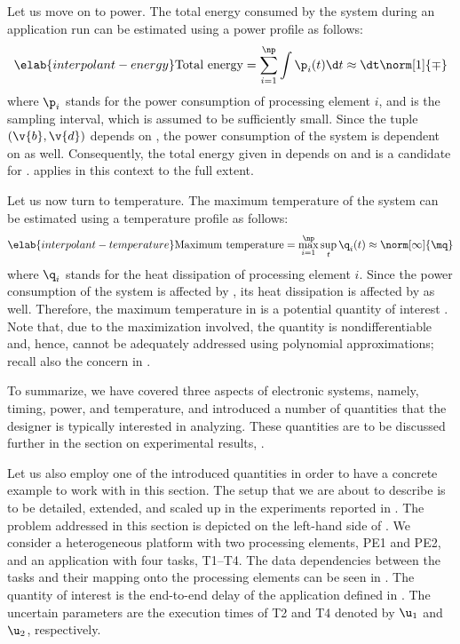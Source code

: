 Let us move on to power. The total energy consumed by the system during an
application run can be estimated using a power profile \mp as follows:
\begin{equation} \elab{interpolant-energy}
  \text{Total energy}
  = \sum_{i = 1}^\np \int \p_i(t) \d t
  \approx \dt \norm[1]{\mp}
\end{equation}
where $\p_i$ stands for the power consumption of processing element $i$, and \dt
is the sampling interval, which is assumed to be sufficiently small. Since the
tuple $(\v{b}, \v{d})$ depends on \vu, the power consumption of the system is
dependent on \vu as well. Consequently, the total energy given in
 depends on \vu and is a candidate for \g.
 applies in this context to the full extent.

Let us now turn to temperature. The maximum temperature of the system can be
estimated using a temperature profile \mq as follows:
\begin{equation} \elab{interpolant-temperature}
  \text{Maximum temperature}
  = \max_{i = 1}^\np \sup_{t} \q_i(t)
  \approx \norm[\infty]{\mq}
\end{equation}
where $\q_i$ stands for the heat dissipation of processing element $i$. Since
the power consumption of the system is affected by \vu, its heat dissipation is
affected by \vu as well. Therefore, the maximum temperature in
 is a potential quantity of interest \g. Note
that, due to the maximization involved, the quantity is nondifferentiable and,
hence, cannot be adequately addressed using polynomial approximations; recall
also the concern in .

To summarize, we have covered three aspects of electronic systems, namely,
timing, power, and temperature, and introduced a number of quantities that the
designer is typically interested in analyzing. These quantities are to be
discussed further in the section on experimental results,
.

Let us also employ one of the introduced quantities in order to have a concrete
example to work with in this section. The setup that we are about to describe is
to be detailed, extended, and scaled up in the experiments reported in
. The problem addressed in this section is depicted on
the left-hand side of . We consider a
heterogeneous platform with two processing elements, PE1 and PE2, and an
application with four tasks, T1--T4. The data dependencies between the tasks and
their mapping onto the processing elements can be seen in
. The quantity of interest \g is the end-to-end
delay of the application defined in . The uncertain
parameters \vu are the execution times of T2 and T4 denoted by $\u_1$ and
$\u_2$, respectively.


